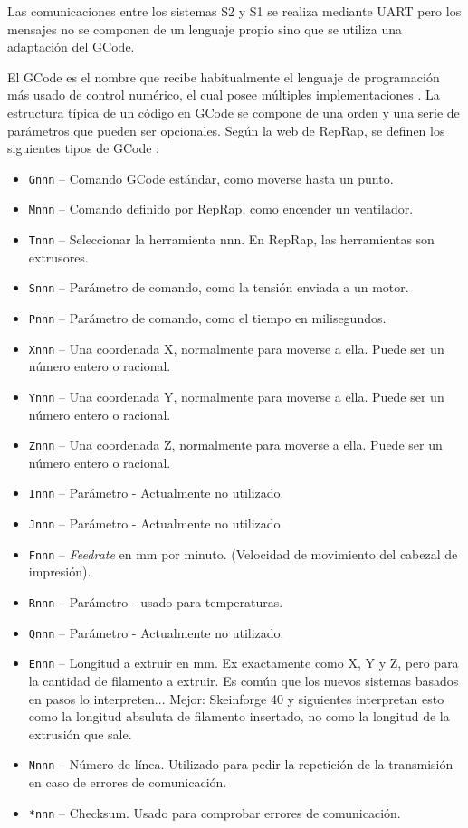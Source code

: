 Las comunicaciones entre los sistemas \ac{S2} y \ac{S1} se realiza mediante \ac{UART}
pero los mensajes no se componen de un lenguaje propio sino que se utiliza una
adaptación del GCode.

El GCode es el nombre que recibe habitualmente el lenguaje de programación más usado
de control numérico, el cual posee múltiples implementaciones \cite{Gcode2020}. La
estructura típica de un código en GCode se compone de una orden y una serie de
parámetros que pueden ser opcionales. Según la web de RepRap, se definen los siguientes
tipos de GCode \cite{GcodeEsRepRap}:

\begin{itemize}
    \item \texttt{Gnnn} -- Comando GCode estándar, como moverse hasta un punto.
    \item \texttt{Mnnn} -- Comando definido por RepRap, como encender un ventilador.
    \item \texttt{Tnnn} -- Seleccionar la herramienta nnn. En RepRap, las herramientas son extrusores.
    \item \texttt{Snnn} -- Parámetro de comando, como la tensión enviada a un motor.
    \item \texttt{Pnnn} -- Parámetro de comando, como el tiempo en milisegundos.
    \item \texttt{Xnnn} -- Una coordenada X, normalmente para moverse a ella. Puede ser un número entero o racional.
    \item \texttt{Ynnn} -- Una coordenada Y, normalmente para moverse a ella. Puede ser un número entero o racional.
    \item \texttt{Znnn} -- Una coordenada Z, normalmente para moverse a ella. Puede ser un número entero o racional.
    \item \texttt{Innn} -- Parámetro - Actualmente no utilizado.
    \item \texttt{Jnnn} -- Parámetro - Actualmente no utilizado.
    \item \texttt{Fnnn} -- \textit{Feedrate} en mm por minuto. (Velocidad de movimiento del cabezal de impresión).
    \item \texttt{Rnnn} -- Parámetro - usado para temperaturas.
    \item \texttt{Qnnn} -- Parámetro - Actualmente no utilizado.
    \item \texttt{Ennn} -- Longitud a extruir en mm. Ex exactamente como X, Y y Z, pero para la cantidad de filamento a extruir. Es común que los nuevos sistemas basados en pasos lo interpreten... Mejor: Skeinforge 40 y siguientes interpretan esto como la longitud absuluta de filamento insertado, no como la longitud de la extrusión que sale.
    \item \texttt{Nnnn} -- Número de línea. Utilizado para pedir la repetición de la transmisión en caso de errores de comunicación.
    \item \texttt{*nnn} -- Checksum. Usado para comprobar errores de comunicación.
\end{itemize}

